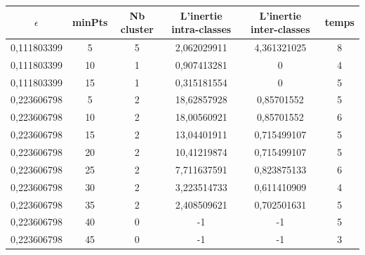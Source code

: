 		\begin{table}[H]
			\centering
			\begin{tabular}{|c|c|c|c|c|c|}
				\hline
				\textbf{$\epsilon$} & \textbf{minPts} & \textbf{Nb cluster} & \textbf{L'inertie intra-classes} & \textbf{L'inertie inter-classes} & \textbf{temps} \\ \hline
				0,111803399         & 5               & 5                   & 2,062029911                      & 4,361321025                      & 8              \\
				0,111803399         & 10              & 1                   & 0,907413281                      & 0                                & 4              \\
				0,111803399         & 15              & 1                   & 0,315181554                      & 0                                & 5              \\
				0,223606798         & 5               & 2                   & 18,62857928                      & 0,85701552                       & 5              \\
				0,223606798         & 10              & 2                   & 18,00560921                      & 0,85701552                       & 6              \\
				0,223606798         & 15              & 2                   & 13,04401911                      & 0,715499107                      & 5              \\
				0,223606798         & 20              & 2                   & 10,41219874                      & 0,715499107                      & 5              \\
				0,223606798         & 25              & 2                   & 7,711637591                      & 0,823875133                      & 6              \\
				0,223606798         & 30              & 2                   & 3,223514733                      & 0,611410909                      & 4              \\
				0,223606798         & 35              & 2                   & 2,408509621                      & 0,702501631                      & 5              \\
				0,223606798         & 40              & 0                   & -1                               & -1                               & 5              \\
				0,223606798         & 45              & 0                   & -1                               & -1                               & 3              \\

\end{tabular}
\end{table}
